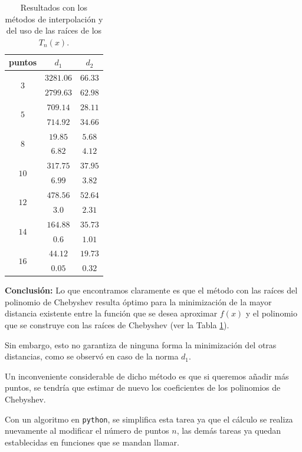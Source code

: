 \vspace*{0.5em}
\begin{table}
\caption{Resultados con los métodos de interpolación y del uso de las raíces de los $T_{n}(x)$.}\label{tab:tabla_01}
\begin{tabular}{| c | c | c |} \hline
puntos & $d_{1}$ & $d_{2}$ \\\hline
\multirow{2}{*}{$3$} & $3281.06$ & $66.33$ \\ \cline{2-3}
 & $2799.63$ & $62.98$ \\ \hline
\multirow{2}{*}{$5$} & $709.14$ & $28.11$ \\ \cline{2-3}
 & $714.92$ & $34.66$ \\ \hline 
\multirow{2}{*}{$8$} & $19.85$ & $5.68$ \\ \cline{2-3}
 & $6.82$ & $4.12$ \\ \hline
\multirow{2}{*}{$10$} & $317.75$ & $37.95$ \\ \cline{2-3}
 & $6.99$ & $3.82$ \\ \hline
\multirow{2}{*}{$12$} & $478.56$ & $52.64$ \\ \cline{2-3}
 & $3.0$ & $2.31$ \\ \hline 
\multirow{2}{*}{$14$} & $164.88$ & $35.73$ \\ \cline{2-3}
 & $0.6$ & $1.01$ \\ \hline
\multirow{2}{*}{$16$} & $44.12$ & $19.73$ \\ \cline{2-3}
 & $0.05$ & $0.32$ \\ \hline
\end{tabular}
\end{table}

\textbf{Conclusión: } Lo que encontramos claramente es que el método con las raíces del polinomio de Chebyshev resulta óptimo para la minimización de la mayor distancia existente entre la función que se desea aproximar $f(x)$ y el polinomio que se construye con las raíces de Chebyshev (ver la Tabla \ref{tab:tabla_01}).
\par
Sin embargo, esto no garantiza de ninguna forma la minimización del otras distancias, como se observó en caso de la norma $d_{1}$.
\par
Un inconveniente considerable de dicho método es que si queremos añadir más puntos, se tendría que estimar de nuevo los coeficientes de los polinomios de Chebyshev.
\par
Con un algoritmo en \texttt{python}, se simplifica esta tarea ya que el cálculo se realiza nuevamente al modificar el número de puntos $n$, las demás tareas ya quedan establecidas en funciones que se mandan llamar.


